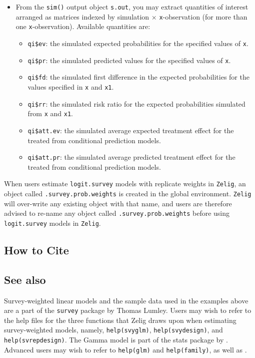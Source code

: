 \begin{itemize}
\item From the {\tt sim()} output object {\tt s.out}, you may extract
  quantities of interest arranged as matrices indexed by simulation
  $\times$ {\tt x}-observation (for more than one {\tt x}-observation).
  Available quantities are:

   \begin{itemize}
   \item {\tt qi\$ev}: the simulated expected probabilities for the
     specified values of {\tt x}.
   \item {\tt qi\$pr}: the simulated predicted values for the
     specified values of {\tt x}.
   \item {\tt qi\$fd}: the simulated first difference in the expected
     probabilities for the values specified in {\tt x} and {\tt x1}.
   \item {\tt qi\$rr}: the simulated risk ratio for the expected
     probabilities simulated from {\tt x} and {\tt x1}.
   \item {\tt qi\$att.ev}: the simulated average expected treatment
     effect for the treated from conditional prediction models.  
   \item {\tt qi\$att.pr}: the simulated average predicted treatment
     effect for the treated from conditional prediction models.  
   \end{itemize}
\end{itemize}

When users estimate {\tt logit.survey} models with replicate weights in {\tt Zelig}, an 
object called {\tt .survey.prob.weights} is created in the global environment.  
{\tt Zelig} will over-write any existing object with that name, and users 
are therefore advised to re-name any object called {\tt .survey.prob.weights} before using {\tt logit.survey} models in {\tt Zelig}.

\subsection* {How to Cite}


 
 
 \subsection* {See also}
 
 Survey-weighted linear models and the sample data used in the
 examples above are a part of the {\tt survey} package by Thomas
 Lumley. Users may wish to refer to the help files for the three
 functions that Zelig draws upon when estimating survey-weighted
 models, namely, {\tt help(svyglm)}, {\tt help(svydesign)}, and {\tt
 help(svrepdesign)}.  The Gamma model is part of the stats package
 by \citet{VenRip02}. Advanced users may wish to refer to
 \texttt{help(glm)} and \texttt{help(family)}, as well as
 \cite{McCNel89}.
